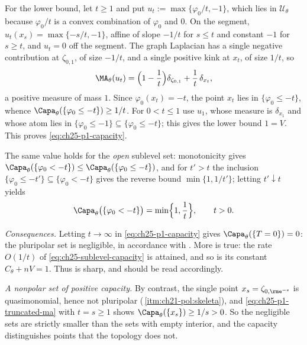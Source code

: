 \begin{example}
For the lower bound, let \(t\geq1\) and put
\(u_t:=\max\{\varphi_0/t,-1\}\), which lies in \(\mathcal U_\theta\) because
\(\varphi_0/t\) is a convex combination of \(\varphi_0\) and \(0\).  On the
segment, \(u_t(x_s)=\max\{-s/t,-1\}\), affine of slope \(-1/t\) for
\(s\leq t\) and constant \(-1\) for \(s\geq t\), and \(u_t=0\) off the
segment.  The graph Laplacian has a single negative contribution at
\(\zeta_{0,1}\), of size \(-1/t\), and a single positive kink at \(x_t\), of
size \(1/t\), so
\begin{equation}
\label{eq:ch25-p1-truncated-ma}
 \MA_\theta(u_t)=\Bigl(1-\frac1t\Bigr)\delta_{\zeta_{0,1}}
   +\frac1t\,\delta_{x_t},
\end{equation}
a positive measure of mass \(1\).  Since
\(\varphi_0(x_t)=-t\), the point \(x_t\) lies in
\(\{\varphi_0\leq-t\}\), whence
\(\Capa_\theta(\{\varphi_0\leq-t\})\geq1/t\).  For \(0<t\leq1\) use
\(u_1\), whose measure is \(\delta_{x_1}\) and whose atom lies in
\(\{\varphi_0\leq-1\}\subseteq\{\varphi_0\leq-t\}\); this gives the lower
bound \(1=V\).  This proves \eqref{eq:ch25-p1-capacity}.

The same value holds for the \emph{open} sublevel set: monotonicity gives
\(\Capa_\theta(\{\varphi_0<-t\})\leq\Capa_\theta(\{\varphi_0\leq-t\})\), and
for \(t'>t\) the inclusion
\(\{\varphi_0\leq-t'\}\subseteq\{\varphi_0<-t\}\) gives the reverse bound
\(\min\{1,1/t'\}\); letting \(t'\downarrow t\) yields
\begin{equation}
\label{eq:ch25-p1-capacity-open}
 \Capa_\theta\bigl(\{\varphi_0<-t\}\bigr)=\min\Bigl\{1,\frac1t\Bigr\},
 \qquad t>0 .
\end{equation}

\emph{Consequences.}  Letting \(t\to\infty\) in
\eqref{eq:ch25-p1-capacity} gives
\(\Capa_\theta(\{T=0\})=0\): the pluripolar set is negligible, in accordance
with .  More is true: the rate
\(O(1/t)\) of \eqref{eq:ch25-sublevel-capacity} is attained, and so is its
constant \(C_\theta+nV=1\).  Thus  is
sharp, and  should be read accordingly.

\emph{A nonpolar set of positive capacity.}  By contrast, the single point
\(x_s=\zeta_{0,\rme^{-s}}\) is quasimonomial, hence not pluripolar
(\,\cref{itm:ch21-pol:skeleta}), and
\eqref{eq:ch25-p1-truncated-ma} with \(t=s\geq1\) shows
\(\Capa_\theta(\{x_s\})\geq1/s>0\).  So the negligible sets are strictly
smaller than the sets with empty interior, and the capacity distinguishes
points that the topology does not.
\end{example}

